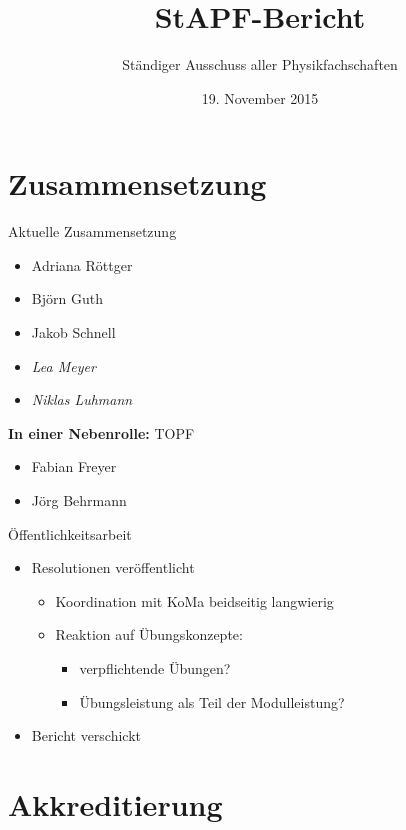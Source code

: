 \documentclass[compress,]{beamer}
\title[StAPf-Bericht]{StAPF-Bericht}
\author{Ständiger Ausschuss aller Physikfachschaften}
\institute[Zusammenkunft aller Physikfachschaften]
\date{19. November 2015}
\begin{document}
\begin{frame}
  \titlepage

\end{frame}

\section{Zusammensetzung}

\begin{frame}{Aktuelle Zusammensetzung}
	\begin{itemize}
		\item Adriana Röttger
		\item Björn Guth
		\item Jakob Schnell
		\item \emph{Lea Meyer}
		\item \emph{Niklas Luhmann}
	\end{itemize}
	\textbf{In einer Nebenrolle:} TOPF
	\begin{itemize}
		\item Fabian Freyer
		\item Jörg Behrmann
	\end{itemize}
\end{frame}

\begin{frame}{Öffentlichkeitsarbeit}
	\begin{itemize}
		\item Resolutionen veröffentlicht
			\begin{itemize}
				\item Koordination mit KoMa beidseitig langwierig
				\item Reaktion auf Übungskonzepte:
					\begin{itemize}
						\item verpflichtende Übungen?
						\item Übungsleistung als Teil der Modulleistung?
					\end{itemize}
			\end{itemize}
		\item Bericht verschickt
	\end{itemize}
\end{frame}

\section{Akkreditierung}
\end{document}

